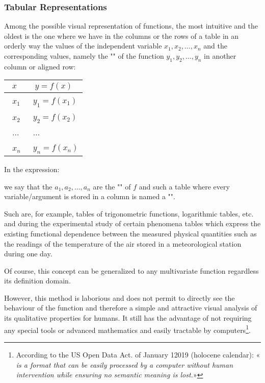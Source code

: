 	\subsubsection{Tabular Representations}
	Among the possible visual representation of functions, the most intuitive and the oldest is the one where we have in the columns or the rows of a table in an orderly way the values of the independent variable $x_1,x_2,\ldots ,x_n$ and the corresponding values, namely the "" of the function $y_1,y_2,\ldots ,y_n$ in another column or aligned row:
	\begin{table}[H]
		\centering
			\begin{tabular}{|p{2cm}|p{2.5cm}|}
				\hline
				\multicolumn{1}{c}{\cellcolor[gray]{0.75}$x$} & 
  \multicolumn{1}{c}{\cellcolor[gray]{0.75}$y=f(x)$}\\ \hline
				\centering\arraybackslash\ $x_1$ & \centering\arraybackslash\ $y_1=f(x_1)$ \\ \hline
				\centering\arraybackslash\ $x_2$ & \centering\arraybackslash\ $y_2=f(x_2)$ \\ \hline
				\centering\arraybackslash\ $\ldots$ & \centering\arraybackslash\ $\ldots$ \\ \hline
				\centering\arraybackslash\ $x_n$ & \centering\arraybackslash\ $y_n=f(x_n)$ \\ \hline
		\end{tabular}
	\end{table}
	In the expression:
	
	we say that the $a_1,a_2,\ldots ,a_n$ are the "" of $f$ and such a table where every variable/argument is stored in a column is named a "".
	
	Such are, for example, tables of trigonometric functions, logarithmic tables, etc. and during the experimental study of certain phenomena tables which express the existing functional dependence between the measured physical quantities such as the readings of the temperature of the air stored in a meteorological station during one day.

	Of course, this concept can be generalized to any multivariate function regardless its definition domain.

	However, this method is laborious and does not permit to directly see the behaviour of the function and therefore a simple and attractive visual analysis of its qualitative properties for humans. It still has the advantage of not requiring any special tools or advanced mathematics and easily tractable by computers\footnote{According to the US Open Data Act. of January 12019 (holocene calendar): «\textit{ is a format that can be easily processed by a computer without human intervention while ensuring no semantic meaning is lost.}»}.
	
